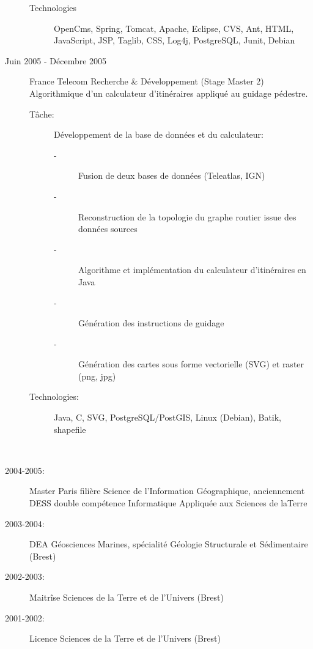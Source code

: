 \documentclass[11pt, oneside, a4paper, french]{article}
\begin{document}
\begin{description}
\begin{description}
  \item[Technologies]  OpenCms, Spring, Tomcat, Apache, Eclipse, CVS, Ant, HTML, JavaScript, JSP, Taglib, CSS, Log4j, PostgreSQL, Junit, Debian
  \end{description}

\item[Juin 2005 - D\'ecembre 2005] France Telecom Recherche \& D\'eveloppement (Stage Master 2)\\
 Algorithmique d'un calculateur d'itin\'eraires  appliqu\'e au guidage p\'edestre.
 \begin{description}
 \item[T\^ache:] D\'eveloppement de la base de donn\'ees et du calculateur:
   \begin{description}
   \item[-] Fusion de deux bases de donn\'ees (Teleatlas, IGN)
   \item[-] Reconstruction de la topologie du graphe routier issue des donn\'ees sources 
   \item[-] Algorithme et impl\'ementation du calculateur d'itin\'eraires en Java
   \item[-] G\'en\'eration des instructions de guidage
   \item[-] G\'en\'eration des cartes sous forme vectorielle (SVG) et raster (png, jpg)
   \end{description}
 \item[Technologies:] Java, C, SVG, PostgreSQL/PostGIS, Linux (Debian), Batik, shapefile
 \end{description}
\end{description}


\newpage
\textbf{
  \Large{
  }
}\\
 \setcounter{vi}{6} %
\begin{description}
  \item[2004-2005:] Master Paris  fili\`ere Science de l'Information G\'eographique, anciennement DESS double comp\'etence Informatique Appliqu\'ee aux Sciences de laTerre
  \item[2003-2004:] DEA G\'eosciences Marines, sp\'ecialit\'e G\'eologie Structurale et S\'edimentaire (Brest)
  \item[2002-2003:] Maitr\^ise Sciences de la Terre et de l'Univers (Brest)
  \item[2001-2002:] Licence Sciences de la Terre et de l'Univers (Brest)
\end{description}
\end{document}
